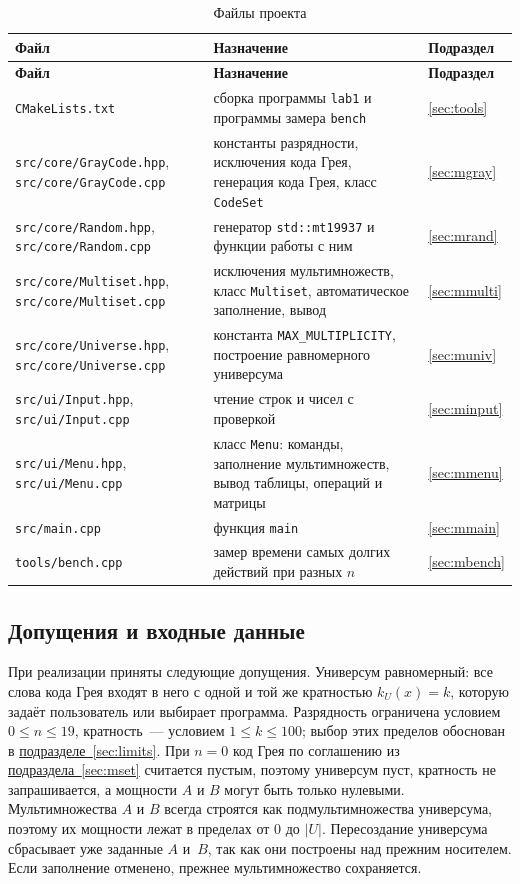 \documentclass[14pt,a4paper]{extarticle}
\newcommand{\lnk}[2]{\hyperref[#1]{#2~\ref*{#1}}}
\newcommand{\code}[1]{\texttt{#1}}
\newcommand{\us}{\_\allowbreak{}}
\newcommand{\kU}{k_U(x)}
\begin{document}
{\small
\begin{longtable}{|P{4.9cm}|P{8.0cm}|P{2.2cm}|}
\caption{Файлы проекта}\label{tab:files}\\
\hline
\textbf{Файл} & \textbf{Назначение} & \textbf{Подраздел}\\\hline
\endfirsthead
\hline
\textbf{Файл} & \textbf{Назначение} & \textbf{Подраздел}\\\hline
\endhead
\code{CMakeLists.txt} & сборка программы \code{lab1} и программы замера \code{bench} & \ref{sec:tools} \\\hline
\code{src/core/GrayCode.hpp}, \code{src/core/GrayCode.cpp} & константы разрядности, исключения кода Грея, генерация кода Грея, класс \code{CodeSet} & \ref{sec:mgray} \\\hline
\code{src/core/Random.hpp}, \code{src/core/Random.cpp} & генератор \code{std::mt19937} и функции работы с ним & \ref{sec:mrand} \\\hline
\code{src/core/Multiset.hpp}, \code{src/core/Multiset.cpp} & исключения мультимножеств, класс \code{Multiset}, автоматическое заполнение, вывод & \ref{sec:mmulti} \\\hline
\code{src/core/Universe.hpp}, \code{src/core/Universe.cpp} & константа \code{MAX\us{}MULTIPLICITY}, построение равномерного универсума & \ref{sec:muniv} \\\hline
\code{src/ui/Input.hpp}, \code{src/ui/Input.cpp} & чтение строк и чисел с проверкой & \ref{sec:minput} \\\hline
\code{src/ui/Menu.hpp}, \code{src/ui/Menu.cpp} & класс \code{Menu}: команды, заполнение мультимножеств, вывод таблицы, операций и матрицы & \ref{sec:mmenu} \\\hline
\code{src/main.cpp} & функция \code{main} & \ref{sec:mmain} \\\hline
\code{tools/bench.cpp} & замер времени самых долгих действий при разных $n$ & \ref{sec:mbench} \\\hline
\end{longtable}
}

\subsection{Допущения и входные данные}

При реализации приняты следующие допущения. Универсум равномерный: все слова кода Грея входят в него с одной и той же кратностью $\kU = k$, которую задаёт пользователь или выбирает программа. Разрядность ограничена условием $0 \leqslant n \leqslant 19$, кратность~--- условием $1 \leqslant k \leqslant 100$; выбор этих пределов обоснован в \lnk{sec:limits}{подразделе}. При $n = 0$ код Грея по соглашению из \lnk{sec:mset}{подраздела} считается пустым, поэтому универсум пуст, кратность не запрашивается, а мощности $A$ и $B$ могут быть только нулевыми. Мультимножества $A$ и $B$ всегда строятся как подмультимножества универсума, поэтому их мощности лежат в пределах от 0 до $|U|$. Пересоздание универсума сбрасывает уже заданные $A$ и~$B$, так как они построены над прежним носителем. Если заполнение отменено, прежнее мультимножество сохраняется.
\end{document}
